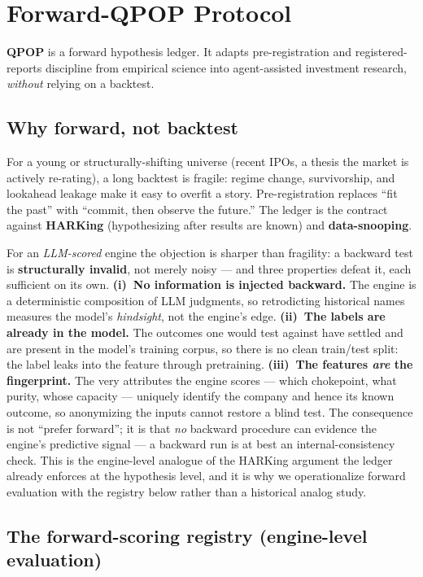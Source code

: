 \documentclass[11pt]{article}
\begin{document}
\section{Forward-QPOP Protocol}

\textbf{QPOP} is a forward hypothesis ledger. It adapts pre-registration and registered-reports
discipline from empirical science into agent-assisted investment research, \emph{without} relying
on a backtest.

\subsection*{Why forward, not backtest}

For a young or structurally-shifting universe (recent IPOs, a thesis the market is actively
re-rating), a long backtest is fragile: regime change, survivorship, and lookahead leakage make it
easy to overfit a story. Pre-registration replaces ``fit the past'' with ``commit, then observe the
future.'' The ledger is the contract against \textbf{HARKing} (hypothesizing after results are known)
and \textbf{data-snooping}.

For an \emph{LLM-scored} engine the objection is sharper than fragility: a backward test is
\textbf{structurally invalid}, not merely noisy --- and three properties defeat it, each sufficient on
its own. \textbf{(i)~No information is injected backward.} The engine is a deterministic composition of
LLM judgments, so retrodicting historical names measures the model's \emph{hindsight}, not the engine's
edge. \textbf{(ii)~The labels are already in the model.} The outcomes one would test against have
settled and are present in the model's training corpus, so there is no clean train/test split: the
label leaks into the feature through pretraining. \textbf{(iii)~The features \emph{are} the
fingerprint.} The very attributes the engine scores --- which chokepoint, what purity, whose capacity
--- uniquely identify the company and hence its known outcome, so anonymizing the inputs cannot restore
a blind test. The consequence is not ``prefer forward''; it is that \emph{no} backward procedure can
evidence the engine's predictive signal --- a backward run is at best an internal-consistency check.
This is the engine-level analogue of the HARKing argument the ledger already enforces at the hypothesis
level, and it is why we operationalize forward evaluation with the registry below rather than a
historical analog study.

\subsection*{The forward-scoring registry (engine-level evaluation)}
\end{document}
